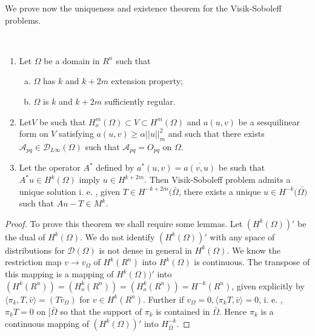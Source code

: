 We prove now the uniqueness and existence theorem for the
Visik-Soboleff problems.  

\begin{theorem}\label{lec19:sec10:subsec3:thm10.2}%
~
  \begin{enumerate}[(1)]
    \item Let $\Omega$ be a domain in $R^n$ such that 
      \begin{enumerate}[(a)]
      \item $\Omega$ has $k$ and $k+2m$ extension property;
      \item $\Omega$ is $k$ and $k+ 2m$ sufficiently regular. 
      \end{enumerate}
      
    \item Let\pageoriginale $V$ be such that $H^m_o (\Omega) \subset V \subset
      H^m(\Omega)$ and $a (u, v)$ be a sesquilinear form on $V$ satisfying
      $a(u, v) \geq \alpha || u ||^2_m$ and such that there exists
      $\mathscr{A}_{pq} \in \mathscr{D}_{L \infty} (\Omega)$ such
      that $\mathscr{A}_{pq} = O_{pq}$ on $\Omega$.  
    \item  Let the operator $A^*$ defined by $a^* (u, v) = \overline{a(v,
      u)}$ be such that $A^* u \in H^k (\Omega)$ imply $u
      \in H^{k + 2m}$. Then Visik-Soboleff problem admits a unique
      solution i. e. , given $T \in H^{-k + 2m} (\bar{\Omega}$,
      there exists a unique $u \in H^{-k } (\bar{\Omega)}$ such that
      $A u - T \in M^k$.
  \end{enumerate}
\end{theorem}

\begin{proof} %
  To prove this theorem we shall require some lemmas. Let $(H^k
  (\Omega))'$ be the dual of $H^k (\Omega)$. We do not identify
  $(H^k(\Omega))'$ with any space of distributions for $\mathscr{D}
  (\Omega)$ is not dense in general in $H^k (\Omega)$. We know the
  restriction map $v \to v_{\Omega}$ of $H^k (R^n)$ into $H^k (\Omega)$
  is continuous. The transpose of this mapping is a mapping of $H^k
  (\Omega))'$ into $(H^k (R^n)) = (H_o^k (R^n)) = (H^k_o(R^n)) = H^{-k}
    (R^n)$, given explicitly by $\langle \pi_k, T, \bar{v} \rangle = (T
  \bar{v}_{\Omega})$ for $v \in H^k (R^n)$. Further if
  $v_{\Omega} = 0, \langle \pi_k T, \bar{v} \rangle = 0$, i. e. , $\pi_k
  T = 0$ on $[ \bar{\Omega}$ so that the support of $\pi_k$ is
  contained in $\bar{\Omega}$. Hence $\pi_k$ is a continuous mapping of
  $(H^k (\Omega))'$ into $H^{-k}_{\bar{\Omega}}$.  
\end{proof}

